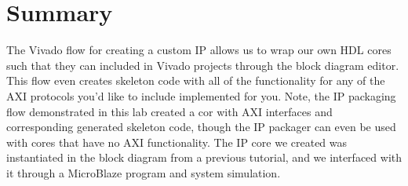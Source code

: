 \documentclass[11pt]{article}
\begin{document}
\section{Summary}
\label{sec:conc}
The Vivado flow for creating a custom IP allows us to wrap our own HDL cores such that they can included in Vivado projects through the block diagram editor. This flow even creates skeleton code with all of the functionality for any of the AXI protocols you'd like to include implemented for you. Note, the IP packaging flow demonstrated in this lab created a cor with AXI interfaces and corresponding generated skeleton code, though the IP packager can even be used with cores that have no AXI functionality. The IP core we created was instantiated in the block diagram from a previous tutorial, and we interfaced with it through a MicroBlaze program and system simulation.
\end{document}
